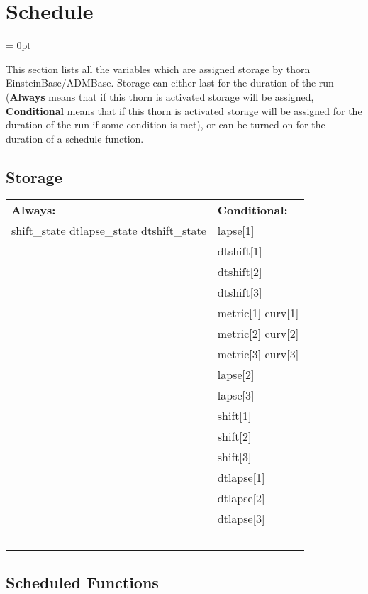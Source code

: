 
\section{Schedule} 


\parskip = 0pt


\noindent This section lists all the variables which are assigned storage by thorn EinsteinBase/ADMBase.  Storage can either last for the duration of the run ({\bf Always} means that if this thorn is activated storage will be assigned, {\bf Conditional} means that if this thorn is activated storage will be assigned for the duration of the run if some condition is met), or can be turned on for the duration of a schedule function.


\subsection*{Storage}

\hspace{5mm}

 \begin{tabular*}{160mm}{ll} 

{\bf Always:}& {\bf Conditional:} \\ 
 shift\_state dtlapse\_state dtshift\_state &  lapse[1]\\ 
~ &  dtshift[1]\\ 
~ &  dtshift[2]\\ 
~ &  dtshift[3]\\ 
~ &  metric[1] curv[1]\\ 
~ &  metric[2] curv[2]\\ 
~ &  metric[3] curv[3]\\ 
~ &  lapse[2]\\ 
~ &  lapse[3]\\ 
~ &  shift[1]\\ 
~ &  shift[2]\\ 
~ &  shift[3]\\ 
~ &  dtlapse[1]\\ 
~ &  dtlapse[2]\\ 
~ &  dtlapse[3]\\ 
~ & ~\\ 
\end{tabular*} 


\subsection*{Scheduled Functions}
\vspace{5mm}


